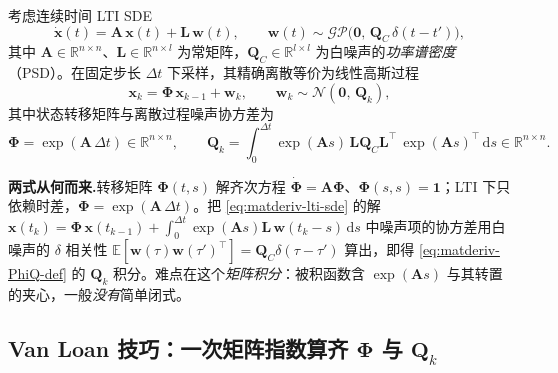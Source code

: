 \begin{definition}\label{def:matderiv-lti}
考虑连续时间 LTI SDE
\begin{equation}
  \dot{\mathbf{x}}(t)=\mathbf{A}\,\mathbf{x}(t)+\mathbf{L}\,\mathbf{w}(t),
  \qquad \mathbf{w}(t)\sim\mathcal{GP}\big(\mathbf{0},\,\mathbf{Q}_C\,\delta(t-t')\big),
  \label{eq:matderiv-lti-sde}
\end{equation}
其中 $\mathbf{A}\in\mathbb{R}^{n\times n}$、$\mathbf{L}\in\mathbb{R}^{n\times l}$ 为常矩阵，$\mathbf{Q}_C\in\mathbb{R}^{l\times l}$ 为白噪声的\emph{功率谱密度}（PSD）。在固定步长 $\Delta t$ 下采样，其精确离散等价为线性高斯过程
\begin{equation}
  \mathbf{x}_k=\boldsymbol{\Phi}\,\mathbf{x}_{k-1}+\mathbf{w}_{k},
  \qquad \mathbf{w}_{k}\sim\mathcal{N}(\mathbf{0},\,\mathbf{Q}_k),
  \label{eq:matderiv-lti-disc}
\end{equation}
其中状态转移矩阵与离散过程噪声协方差为
\begin{equation}
  \boldsymbol{\Phi}=\exp(\mathbf{A}\,\Delta t)\in\mathbb{R}^{n\times n},
  \qquad
  \mathbf{Q}_k=\int_{0}^{\Delta t}\!\exp(\mathbf{A}s)\,\mathbf{L}\mathbf{Q}_C\mathbf{L}^\top\,\exp(\mathbf{A}s)^\top\,\mathrm{d}s\in\mathbb{R}^{n\times n}.
  \label{eq:matderiv-PhiQ-def}
\end{equation}
\end{definition}

\begin{note}
\textbf{两式从何而来.}\;转移矩阵 $\boldsymbol{\Phi}(t,s)$ 解齐次方程 $\dot{\boldsymbol{\Phi}}=\mathbf{A}\boldsymbol{\Phi}$、$\boldsymbol{\Phi}(s,s)=\mathbf{1}$；LTI 下只依赖时差，$\boldsymbol{\Phi}=\exp(\mathbf{A}\,\Delta t)$。把 \cref{eq:matderiv-lti-sde} 的解 $\mathbf{x}(t_k)=\boldsymbol{\Phi}\,\mathbf{x}(t_{k-1})+\int_0^{\Delta t}\exp(\mathbf{A}s)\mathbf{L}\,\mathbf{w}(t_k-s)\,\mathrm{d}s$ 中噪声项的协方差用白噪声的 $\delta$ 相关性 $\mathbb{E}[\mathbf{w}(\tau)\mathbf{w}(\tau')^\top]=\mathbf{Q}_C\delta(\tau-\tau')$ 算出，即得 \cref{eq:matderiv-PhiQ-def} 的 $\mathbf{Q}_k$ 积分。难点在这个\emph{矩阵积分}：被积函数含 $\exp(\mathbf{A}s)$ 与其转置的夹心，一般\emph{没有}简单闭式。
\end{note}

\subsection{Van Loan 技巧：一次矩阵指数算齐 \texorpdfstring{$\boldsymbol{\Phi}$}{Phi} 与 \texorpdfstring{$\mathbf{Q}_k$}{Qk}}
\label{sec:matderiv-vanloan-trick}

